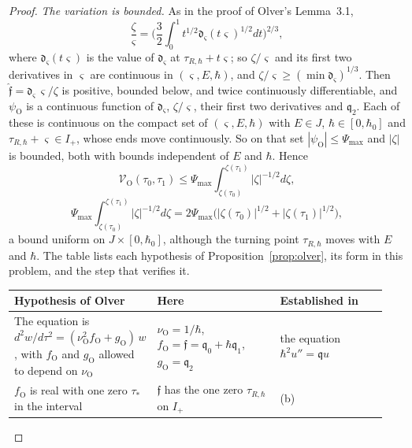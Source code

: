 \documentclass[aps,prd,onecolumn,tightenlines,nofootinbib,notitlepage,11pt,floatfix]{revtex4-2}
\theoremstyle{indentedtheorem}
\begin{document}
\begin{proof}
\emph{The variation is bounded.} As in the proof of Olver's Lemma~3.1, \[ \frac{\zeta}{\varsigma}=\bigg(\frac{3}{2}\int_0^1t^{1/2}\mathfrak{d}_\varsigma(t\varsigma)^{1/2}dt\bigg)^{2/3} , \] where $\mathfrak{d}_\varsigma(t\varsigma)$ is the value of $\mathfrak{d}_\varsigma$ at $\tau_{R,\hbar}+t\varsigma$; so $\zeta/\varsigma$ and its first two derivatives in $\varsigma$ are continuous in $(\varsigma,E,\hbar)$, and $\zeta/\varsigma\geq(\min \mathfrak{d}_\varsigma)^{1/3}$. Then $\hat{\mathfrak{f}}=\mathfrak{d}_\varsigma\,\varsigma/\zeta$ is positive, bounded below, and twice continuously differentiable, and $\psi_\text{O}$ is a continuous function of $\mathfrak{d}_\varsigma$, $\zeta/\varsigma$, their first two derivatives and $\mathfrak{q}_2$. Each of these is continuous on the compact set of $(\varsigma,E,\hbar)$ with $E\in J$, $\hbar\in[0,\hbar_0]$ and $\tau_{R,\hbar}+\varsigma\in I_+$, whose ends move continuously. So on that set $|\psi_\text{O}|\leq\Psi_\text{max}$ and $|\zeta|$ is bounded, both with bounds independent of $E$ and $\hbar$. Hence
\begin{equation*}
    \mathcal{V}_\text{O}(\tau_0,\tau_1) \leq \Psi_\text{max}\int_{\zeta(\tau_0)}^{\zeta(\tau_1)}|\zeta|^{-1/2}d\zeta ,
\end{equation*}
\begin{equation*}
    \Psi_\text{max}\int_{\zeta(\tau_0)}^{\zeta(\tau_1)}|\zeta|^{-1/2}d\zeta = 2\Psi_\text{max}\big(|\zeta(\tau_0)|^{1/2}+|\zeta(\tau_1)|^{1/2}\big) ,
\end{equation*}
a bound uniform on $J\times[0,\hbar_0]$, although the turning point $\tau_{R,\hbar}$ moves with $E$ and $\hbar$. The table lists each hypothesis of Proposition~\ref{prop:olver}, its form in this problem, and the step that verifies it.
\begin{center}
\small
\setlength{\tabcolsep}{3pt}
\begin{tabular}{p{0.30\linewidth}p{0.34\linewidth}p{0.30\linewidth}}
\hline
\textbf{Hypothesis of Olver} & \textbf{Here} & \textbf{Established in} \\
\hline
The equation is $d^2w/d\tau^2=(\nu_\text{O}^2f_\text{O}+g_\text{O})\,w$, with $f_\text{O}$ and $g_\text{O}$ allowed to depend on $\nu_\text{O}$ & $\nu_\text{O}=1/\hbar$, $f_\text{O}=\mathfrak{f}=\mathfrak{q}_0+\hbar\mathfrak{q}_1$, $g_\text{O}=\mathfrak{q}_2$ & the equation $\hbar^2u''=\mathfrak{q}u$ \\
$f_\text{O}$ is real with one zero $\tau_*$ in the interval & $\mathfrak{f}$ has the one zero $\tau_{R,\hbar}$ on $I_+$ & (b) \\

\end{tabular}
\end{center}
\end{proof}
\end{document}
